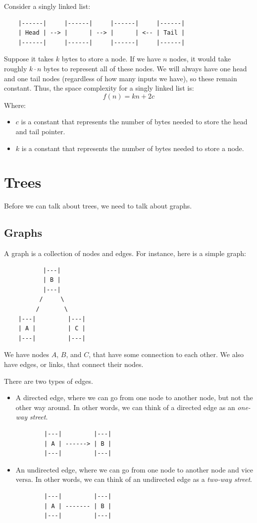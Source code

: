 \documentclass[letterpaper]{article}
\begin{document}
\bigskip 

Consider a singly linked list: 
\begin{verbatim}
    |------|     |------|     |------|     |------| 
    | Head | --> |      | --> |      | <-- | Tail | 
    |------|     |------|     |------|     |------|
\end{verbatim}
Suppose it takes $k$ bytes to store a node. If we have $n$ nodes, it would take roughly $k \cdot n$ bytes to represent all of these nodes. We will always have one head and one tail nodes (regardless of how many inputs we have), so these remain constant. Thus, the space complexity for a singly linked list is: 
\[f(n) = kn + 2c\]
Where: 
\begin{itemize}
    \item $c$ is a constant that represents the number of bytes needed to store the head and tail pointer.
    \item $k$ is a constant that represents the number of bytes needed to store a node. 
\end{itemize}

\section{Trees}
Before we can talk about trees, we need to talk about graphs. 

\subsection{Graphs}
A graph is a collection of nodes and edges. For instance, here is a simple graph: 
\begin{verbatim}
           |---|
           | B |
           |---|
          /     \
         /       \
    |---|         |---|
    | A |         | C |
    |---|         |---|
\end{verbatim}
We have nodes $A$, $B$, and $C$, that have some connection to each other. We also have edges, or links, that connect their nodes. 

\bigskip 

There are two types of edges. 
\begin{itemize}
    \item A directed edge, where we can go from one node to another node, but not the other way around. In other words, we can think of a directed edge as an \emph{one-way street}. 
    \begin{verbatim}
        |---|         |---|
        | A | ------> | B |
        |---|         |---|
    \end{verbatim}

    \item An undirected edge, where we can go from one node to another node and vice versa. In other words, we can think of an undirected edge as a \emph{two-way street}. 
    \begin{verbatim}
        |---|         |---|
        | A | ------- | B |
        |---|         |---|
    \end{verbatim}
\end{itemize}
\end{document}
